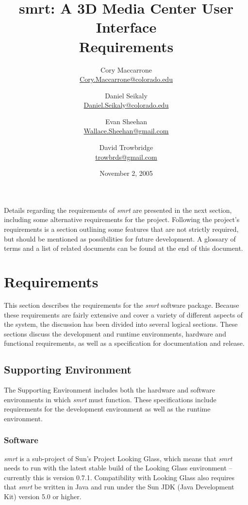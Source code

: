 \documentclass[letterpaper, titlepage, 11pt]{article}
\title{
	smrt: A 3D Media Center User Interface
	\\
	Requirements
}
\author{
	Cory Maccarrone  \\ {\small \href{mailto:Cory.Maccarrone@colorado.edu}{Cory.Maccarrone@colorado.edu}}
	\and
	Daniel Seikaly   \\ {\small \href{mailto:Daniel.Seikaly@colorado.edu}{Daniel.Seikaly@colorado.edu}}
	\and
	Evan Sheehan     \\ {\small \href{mailto:Wallace.Sheehan@gmail.com}{Wallace.Sheehan@gmail.com}}
	\and
	David Trowbridge \\ {\small \href{mailto:trowbrds@gmail.com}{trowbrds@gmail.com}}
}
\date{November 2, 2005}
\begin{document}
\maketitle

\raggedbottom


\hspace{1em}
\pagebreak

\tableofcontents
\listoffigures
\pagebreak

\hspace{1em}
\pagebreak




Details regarding the requirements of \textit{smrt} are presented in the next
section, including some alternative requirements for the project. Following the
project's requirements is a section outlining some features that are not
strictly required, but should be mentioned as possibilities for future
development. A glossary of terms and a list of related documents can be found at
the end of this document.

\section{Requirements}
\label{sec:requirements}
This section describes the requirements for the \textit{smrt} software package.
Because these requirements are fairly extensive and cover a variety of different
aspects of the system, the discussion has been divided into several logical
sections.  These sections discuss the development and runtime environments,
hardware and functional requirements, as well as a specification for
documentation and release.

\pagebreak

\subsection{Supporting Environment}
The Supporting Environment includes both the hardware and software environments
in which \textit{smrt} must function. These specifications include requirements
for the development environment as well as the runtime environment.

\subsubsection{Software}
\textit{smrt} is a sub-project of Sun's Project Looking Glass, which means that
\textit{smrt} needs to run with the latest stable build of the Looking Glass
environment -- currently this is version 0.7.1. Compatibility with Looking Glass
also requires that \textit{smrt} be written in Java and run under the Sun JDK
(Java Development Kit) version 5.0 or higher.
\end{document}
